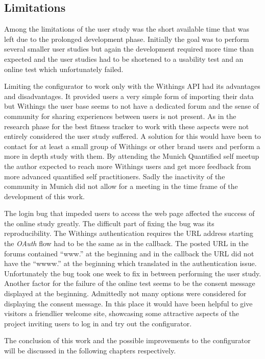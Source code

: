 \documentclass[../medieninformatik-arbeit.tex]{subfiles}
\begin{document}
\subsection{Limitations}
Among the limitations of the user study was the short available time that was left due to the prolonged development phase. Initially the goal was to perform several smaller user studies but again the development required more time than expected and the user studies had to be shortened to a usability test and an online test which unfortunately failed. 

Limiting the configurator to work only with the Withings API had its advantages and disadvantages. It provided users a very simple form of importing their data but Withings the user base seems to not have a dedicated forum and the sense of community for sharing experiences between users is not present. As in the research phase for the best fitness tracker to work with these aspects were not entirely considered the user study suffered. A solution for this would have been to contact for at least a small group of Withings or other brand users and perform a more in depth study with them. By attending the Munich Quantified self meetup the author expected to reach more Withings users and get more feedback from more advanced quantified self practitioners. Sadly the inactivity of the community in Munich did not allow for a meeting in the time frame of the development of this work. 

The login bug that impeded users to access the web page affected the success of the online study greatly. The difficult part of fixing the bug was its reproducibility. The Withings authentication requires the URL address starting the \textit{OAuth} flow had to be the same as in the callback. The posted URL in the forums contained ``www.'' at the beginning and in the callback the URL did not have the ``wwww.'' at the beginning which translated in the authentication issue. Unfortunately the bug took one week to fix in between performing the user study. Another factor for the failure of the online test seems to be the consent message displayed at the beginning. Admittedly not many options were considered for displaying the consent message. In this place it would have been helpful to give visitors a friendlier welcome site, showcasing some attractive aspects of the project inviting users to log in and try out the configurator. 

The conclusion of this work and the possible improvements to the configurator will be discussed in the following chapters respectively. 
\end{document}
